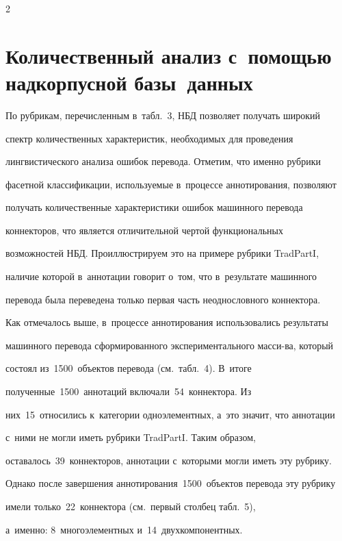 \begin{multicols}{2}
\section{Количественный анализ с~помощью надкорпусной базы~данных}


  


  По рубрикам, перечисленным в~табл.~3, НБД позволяет получать широкий 


спектр количественных характеристик, необходимых для проведения 


лингвистического анализа ошибок перевода. Отметим, что именно рубрики 


фасетной классификации, используемые в~процессе аннотирования, позволяют 


получать количественные характеристики ошибок машинного перевода 


коннекторов, что является отличительной чертой функциональных 


возможностей НБД. Проиллюстрируем это на примере рубрики TradPartI, 


наличие которой в~аннотации говорит о~том, что в~результате машинного 


перевода была переведена только первая часть неоднословного коннектора.


  


  Как отмечалось выше, в~процессе аннотирования использовались результаты 


машинного перевода сформированного экспериментального масси-\linebreak ва, который 


состоял из~1500~объектов перевода (см.\ табл.~4). В~итоге 


полученные~1500~аннотаций вклю\-ча\-ли~54~коннектора. Из 


них~15~относились к~категории одноэлементных, а~это значит, что аннотации 


с~ними не могли иметь рубрики TradPartI. Таким образом, 


оставалось~39~коннекторов, аннотации с~которыми могли иметь эту рубрику. 


Однако после завершения аннотирования~1500~объектов перевода эту рубрику 


имели только~22~коннектора (см.\ первый столбец табл.~5), 


а~именно: 8~многоэлементных и~14~двухкомпонентных.



\end{multicols}
